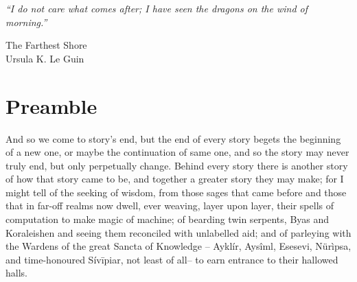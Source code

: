 \epigraph{
    \emph{
        ``I do not care what comes after; I have seen the dragons on the wind of morning.''
} 
%
}
{The Farthest Shore\\Ursula K. Le Guin}
%
\section*{Preamble}
%
And so we come to story's end, but the end of every story begets the beginning of a new one, or
maybe the continuation of same one, and so the story may never truly end, but only perpetually
change.
%
Behind every story there is another story of how that story came to be, and together a greater
story they may make;
%
for I might tell of the seeking of wisdom, from those sages that came before and those that
in far-off realms now dwell, ever weaving, layer upon layer, their spells of computation to make
magic of machine;
%
of bearding twin serpents, Byas and Koraleishen and seeing them reconciled with unlabelled aid;
%
and of parleying with the Wardens of the great Sancta of Knowledge -- Aykl\'ir, Ays\^iml, Esesevi,
N\"ur\`ipsa, and time-honoured S\'iv\={i}piar, not least of all-- to earn entrance to their
hallowed halls.
%
